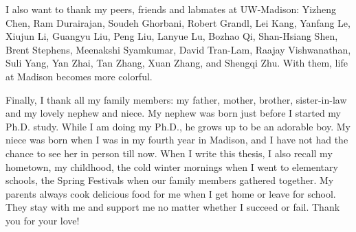 I also want to thank my peers, friends and labmates at UW-Madison: Yizheng Chen, 
Ram Durairajan, Soudeh Ghorbani, Robert Grandl, Lei Kang, Yanfang Le, 
Xiujun Li, Guangyu Liu, Peng Liu, Lanyue Lu, Bozhao Qi, Shan-Hsiang Shen, 
Brent Stephens, Meenakshi Syamkumar, David Tran-Lam, Raajay Vishwanathan, 
Suli Yang, Yan Zhai, Tan Zhang, Xuan Zhang, and Shengqi Zhu. 
With them, life at Madison becomes more colorful.

Finally, I thank all my family members: my father, mother, brother, 
sister-in-law and my lovely nephew and niece. My nephew was born just before 
I started my Ph.D. study. While I am doing my Ph.D., he grows up to be 
an adorable boy. My niece was born when I was in my fourth year in Madison, and 
I have not had the chance to see her in person till now. When I write this thesis, 
I also recall my hometown, my childhood, the cold winter mornings when I went 
to elementary schools, the Spring Festivals when our family members gathered together. 
My parents always cook delicious food for me when I get home or leave for school. 
They stay with me and support me no matter whether I succeed or fail. Thank you for your love!



